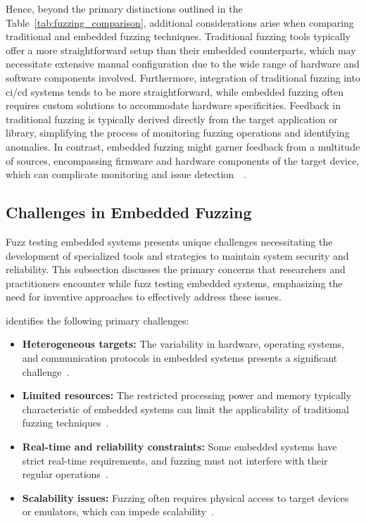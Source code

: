 Hence, beyond the primary distinctions outlined in the Table~\ref{tab:fuzzing_comparison},
additional considerations arise when comparing traditional and embedded fuzzing techniques.
Traditional fuzzing tools typically offer a more straightforward setup than their embedded counterparts,
which may necessitate extensive manual configuration due to the wide range of
hardware and software components involved. Furthermore, integration of traditional
fuzzing into \acrlong{ci/cd} systems tends to be more straightforward,
while embedded fuzzing often requires custom solutions to accommodate
hardware specificities. Feedback in traditional fuzzing is typically
derived directly from the target application or library,
simplifying the process of monitoring fuzzing operations and
identifying anomalies. In contrast, embedded fuzzing might garner feedback
from a multitude of sources, encompassing firmware and hardware components
of the target device, which can complicate monitoring and issue detection~\cite{yun2022fuzzing}~\cite{WhatAreE30:online}.

\subsection{Challenges in Embedded Fuzzing}
Fuzz testing embedded systems presents unique challenges necessitating the
development of specialized tools and strategies to maintain system security and
reliability. This subsection discusses the primary concerns that researchers and
practitioners encounter while fuzz testing embedded systems, emphasizing the need for
inventive approaches to effectively address these issues.

 identifies the following primary challenges:
\begin{itemize}
\item \textbf{Heterogeneous targets:} The variability in hardware, operating systems, and communication protocols in embedded systems presents a significant challenge~\cite{yun2022fuzzing}.
\item \textbf{Limited resources:} The restricted processing power and memory typically characteristic of embedded systems can limit the applicability of traditional fuzzing techniques~\cite{yun2022fuzzing}.
\item \textbf{Real-time and reliability constraints:} Some embedded systems have strict real-time requirements, and fuzzing must not interfere with their regular operations~\cite{yun2022fuzzing}.
\item \textbf{Scalability issues:} Fuzzing often requires physical access to target devices or emulators, which can impede scalability~\cite{yun2022fuzzing}.
\end{itemize}

